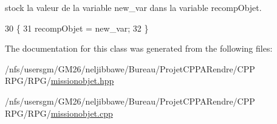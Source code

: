 stock la valeur de la variable new\-\_\-var dans la variable recomp\-Objet. 


\begin{DoxyCode}
30                                                    \{
31       recompObjet = new\_var;
32   \}
\end{DoxyCode}


The documentation for this class was generated from the following files\-:\begin{DoxyCompactItemize}
\item 
/nfs/usersgm/\-G\-M26/neljibbawe/\-Bureau/\-Projet\-C\-P\-P\-A\-Rendre/\-C\-P\-P R\-P\-G/\-R\-P\-G/\hyperlink{missionobjet_8hpp}{missionobjet.\-hpp}\item 
/nfs/usersgm/\-G\-M26/neljibbawe/\-Bureau/\-Projet\-C\-P\-P\-A\-Rendre/\-C\-P\-P R\-P\-G/\-R\-P\-G/\hyperlink{missionobjet_8cpp}{missionobjet.\-cpp}\end{DoxyCompactItemize}
